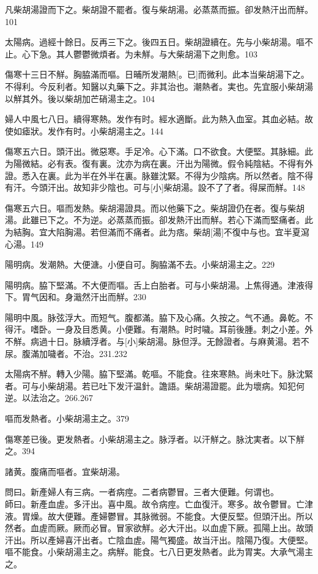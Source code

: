 \documentclass[12pt,twoside,UTF8,b5paper]{ctexbook}
\begin{document}
凡柴胡湯證而下之。柴胡證不罷者。復与柴胡湯。必蒸蒸而振。卻发熱汗出而觧。101

太陽病。過經十餘日。反再三下之。後四五日。柴胡證續在。先与小柴胡湯。嘔不止。心下急。其人鬱鬱微煩者。为未觧。与大柴胡湯下之則愈。103

傷寒十三日不觧。胸脇滿而嘔。日晡所发潮熱[。已]而微利。此本当柴胡湯下之。不得利。今反利者。知醫以丸藥下之。非其治也。潮熱者。実也。先宜服小柴胡湯以觧其外。後以柴胡加芒硝湯主之。104

婦人中風七八日。續得寒熱。发作有时。經水適斷。此为熱入血室。其血必結。故使如瘧狀。发作有时。小柴胡湯主之。144

傷寒五六日。頭汗出。微惡寒。手足冷。心下滿。口不欲食。大便堅。其脉細。此为陽微結。必有表。復有裏。沈亦为病在裏。汗出为陽微。假令純陰結。不得有外證。悉入在裏。此为半在外半在裏。脉雖沈緊。不得为少陰病。所以然者。陰不得有汗。今頭汗出。故知非少陰也。可与[小]柴胡湯。設不了了者。得屎而觧。148

傷寒五六日。嘔而发熱。柴胡湯證具。而以他藥下之。柴胡證仍在者。復与柴胡湯。此雖已下之。不为逆。必蒸蒸而振。卻发熱汗出而觧。若心下滿而堅痛者。此为結胸。宜大陷胸湯。若但滿而不痛者。此为痞。柴胡[湯]不復中与也。宜半夏瀉心湯。149

陽明病。发潮熱。大便溏。小便自可。胸脇滿不去。小柴胡湯主之。229

陽明病。脇下堅滿。不大便而嘔。舌上白胎者。可与小柴胡湯。上焦得通。津液得下。胃气因和。身濈然汗出而觧。230

陽明中風。脉弦浮大。而短气。腹都滿。脇下及心痛。久按之。气不通。鼻乾。不得汗。嗜卧。一身及目悉黄。小便難。有潮熱。时时噦。耳前後腫。刺之小差。外不觧。病過十日。脉續浮者。与[小]柴胡湯。脉但浮。无餘證者。与麻黄湯。若不尿。腹滿加噦者。不治。231.232

太陽病不觧。轉入少陽。脇下堅滿。乾嘔。不能食。往來寒熱。尚未吐下。脉沈緊者。可与小柴胡湯。若已吐下发汗温針。譫語。柴胡湯證罷。此为壞病。知犯何逆。以法治之。266.267

嘔而发熱者。小柴胡湯主之。379

傷寒差已後。更发熱者。小柴胡湯主之。脉浮者。以汗觧之。脉沈実者。以下觧之。394

諸黄。腹痛而嘔者。宜柴胡湯。

問曰。新產婦人有三病。一者病痙。二者病鬱冒。三者大便難。何谓也。\\
師曰。新產血虗。多汗出。喜中風。故令病痙。亡血復汗。寒多。故令鬱冒。亡津液。胃燥。故大便難。產婦鬱冒。其脉微弱。不能食。大便反堅。但頭汗出。所以然者。血虗而厥。厥而必冒。冒家欲觧。必大汗出。以血虗下厥。孤陽上出。故頭汗出。所以產婦喜汗出者。亡陰血虗。陽气獨盛。故当汗出。陰陽乃復。大便堅。嘔不能食。小柴胡湯主之。病觧。能食。七八日更发熱者。此为胃実。大承气湯主之。
\end{document}
